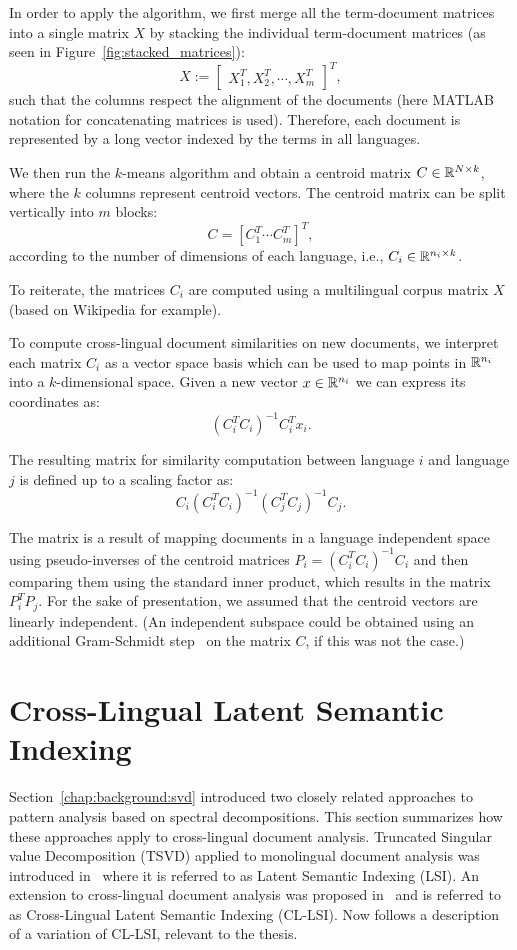 In order to apply the algorithm, we first merge all the term-document matrices into a single matrix
$X$ by stacking the individual term-document matrices (as seen in Figure~\ref{fig:stacked_matrices}):
$$X := \begin{bmatrix}X_1^T ,X_2^T, \cdots, X_m^T \end{bmatrix}^T,$$
such that the columns respect the alignment of the documents (here MATLAB notation for concatenating
matrices is used). Therefore, each document is represented by a long vector indexed by the terms in all languages.

We then run the $k$-means algorithm and obtain a centroid matrix $C \in \mathbb{R}^{N \times k}$,
where the $k$ columns represent centroid vectors. The centroid matrix can be split vertically into $m$
blocks: $$C = [C_1^T \cdots C_m^T]^T,$$ according to the number of dimensions of each language,
i.e., $C_i \in \mathbb{R}^{n_i \times k}$.

To reiterate, the matrices $C_i$ are computed using a multilingual corpus
matrix $X$ (based on Wikipedia for example).

To compute  cross-lingual document similarities on new documents, we interpret each matrix $C_i$
as a vector space basis which can be used to map points in $\mathbb{R}^{n_i}$ into a $k$-dimensional space. Given
a new vector $x \in \mathbb{R}^{n_i}$ we can express its coordinates as:
$$(C_i^T C_i)^{-1} C_i^T x_i.$$

The resulting matrix for similarity computation between language $i$ and language $j$
is defined up to a scaling factor as:
$$C_i(C_i^T C_i)^{-1} (C_j^T C_j)^{-1} C_j.$$

The matrix is a result of mapping documents in a language independent space using
pseudo-inverses of the centroid matrices $P_i = (C_i^T C_i)^{-1} C_i$ and then
comparing them using the standard inner product, which results in the matrix
$P_i^T P_j$. For the sake of presentation, we assumed that the centroid vectors
are linearly independent. (An independent subspace could be obtained using an
additional Gram-Schmidt step~\cite{golub} on the matrix $C$, if this was not the case.)

\section{Cross-Lingual Latent Semantic Indexing}\label{chap:crosslingual:LSI}

Section~\ref{chap:background:svd} introduced two closely related approaches
to pattern analysis based on spectral decompositions. This section summarizes
how these approaches apply to cross-lingual document analysis. Truncated Singular
value Decomposition (TSVD) applied to monolingual document analysis was introduced
in~\cite{lsi} where it is referred to as Latent Semantic Indexing (LSI). An extension
to cross-lingual document analysis was proposed in~\cite{cl_lsi} and is referred to as
Cross-Lingual Latent Semantic Indexing (CL-LSI). Now follows a description of a
variation of CL-LSI, relevant to the thesis.


